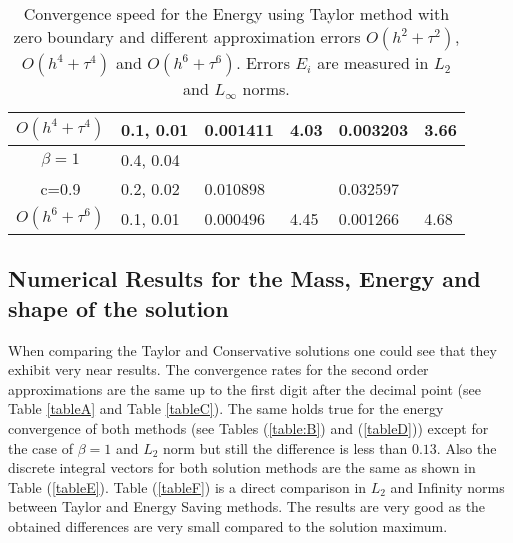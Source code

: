 \documentclass[%
 aip,
cp,  %
 amsmath,amssymb,%
 reprint,%
]{revtex4-2}
\newcommand{\rf}[1]{(\ref{#1})}
\begin{document}
\begin{table}[ht]
\begin{tabular}{||c|l|ll|ll||}
       $O(h^4+ \tau^4)$ &0.1, 0.01   &0.001411 & 4.03   & 0.003203  & 3.66  \\
    \hline
  $\beta=1$     &0.4, 0.04   &            &          &                  &      \\
      c=0.9                    &0.2, 0.02   &0.010898 &           & 0.032597      &       \\
     $O(h^6+ \tau^6)$ &0.1, 0.01 & 0.000496 &4.45 & 0.001266  & 4.68        \\
	   \hline
			\hline 
		\end{tabular}
		\caption{Convergence speed for the Energy using Taylor method with zero boundary and different approximation errors $O(h^{2} + \tau^2 )$, $O(h^{4} + \tau^4 )$ and $O(h^{6} + \tau^6 )$. Errors $E_i$ are measured in $L_2$ and $L_\infty$ norms.}
\label{tableB}
\end{table}

\subsection{Numerical Results for the Mass, Energy and shape of the solution}

When comparing the Taylor and Conservative solutions one could see that they exhibit very near results. The convergence rates for the second order approximations are the same up to the first digit after the decimal point (see Table \ref{tableA} and Table \ref{tableC}). The same holds true for the energy convergence of both methods (see Tables \rf{table:B} and  \rf{tableD}) except for the case of $\beta = 1$ and $L_2$ norm but still the difference is less than $0.13$. Also the discrete integral vectors for both solution methods are the same as shown in Table \rf{tableE}. Table \rf{tableF} is a direct comparison in $L_2$ and Infinity norms between Taylor and Energy Saving methods. The results are very good as the obtained differences are very small compared to the solution maximum.
\end{document}
